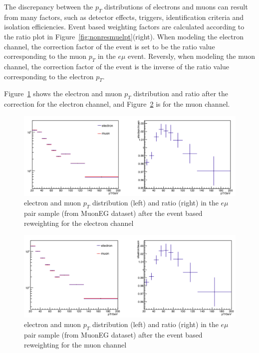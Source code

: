 \vspace{0.3cm}
The discrepancy between the $p_T$ distributions of electrons and muons can result from many factors, such as detector effects, triggers, identification criteria and isolation efficiencies. Event based weighting factors are calculated according to the ratio plot in Figure~\ref{fig:nonresmuelpt}(right). When modeling the electron channel, the correction factor of the event is set to be the ratio value corresponding to the muon $p_T$ in the $e\mu$ event. Reversly, when modeling the muon channel, the correction factor of the event is the inverse of the ratio value corresponding to the electron $p_T$.

\vspace{0.3cm}
Figure~\ref{fig:nonresmuelptel} shows the electron and muon $p_T$ distribution and ratio after the correction for the electron channel, and Figure~\ref{fig:nonresmuelptmu} is for the muon channel.

\begin{figure}[htbp]
\begin{center}
\includegraphics[width=0.95\linewidth]{figures/nonresmuelptel.png}
\caption{electron and muon $p_T$ distribution (left) and ratio (right) in the $e\mu$ pair sample (from MuonEG dataset) after the event based reweighting for the electron channel}
\label{fig:nonresmuelptel}
\end{center}
\end{figure}

\begin{figure}[htbp]
\begin{center}
\includegraphics[width=0.95\linewidth]{figures/nonresmuelptmu.png}
\caption{electron and muon $p_T$ distribution (left) and ratio (right) in the $e\mu$ pair sample (from MuonEG dataset) after the event based reweighting for the muon channel}
\label{fig:nonresmuelptmu}
\end{center}
\end{figure}

